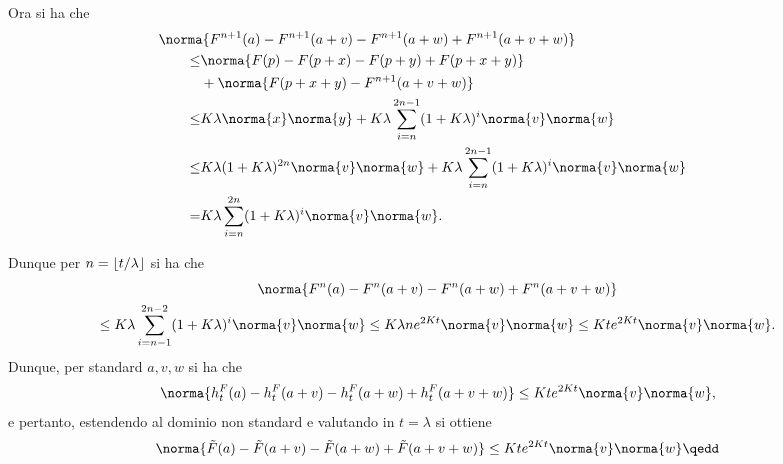 {\begin{itemize}
            Ora si ha che \begin{align*}
                &\hspace{-3em}\norma{F^{n+1}(a)-F^{n+1}(a+v)-F^{n+1}(a+w)+F^{n+1}(a+v+w)}\\ 
                \le  &\norma{F(p)-F(p+x)-F(p+y)+F(p+x+y)}\\&+\norma{F(p+x+y)-F^{n+1}(a+v+w)}\\ 
                \le &K \lambda\norma{x}\norma{y} + K \lambda\sum_{i=n}^{2n-1}(1+K\lambda)^{i}\norma{v}\norma{w} \\ 
                \le &K \lambda(1+K\lambda)^{2n}\norma{v}\norma{w} + K \lambda\sum_{i=n}^{2n-1}(1+K\lambda)^{i}\norma{v}\norma{w} \\ 
                = & K \lambda\sum_{i=n}^{2n}(1+K\lambda)^{i}\norma{v}\norma{w}. 
            \end{align*}
    \end{itemize}

    Dunque per $ n=\left\lfloor t/\lambda \right\rfloor $ si ha che \begin{multline*}
        \norma{F^{n}(a)-F^{n}(a+v)-F^{n}(a+w)+F^{n}(a+v+w)} \\
        \le K \lambda\sum_{i=n-1}^{2n-2}(1+K\lambda)^{i}\norma{v}\norma{w} \le K \lambda n e^{2Kt}\norma{v}\norma{w} \le K t e^{2Kt}\norma{v}\norma{w}.
    \end{multline*}Dunque, per standard $ a,v,w $ si ha che \begin{equation*}
        \norma{h_{t}^F(a)-h_{t}^F(a+v)-h_{t}^F(a+w)+h_{t}^F(a+v+w)}\le K t e^{2Kt}\norma{v}\norma{w},
    \end{equation*}e pertanto, estendendo al dominio non standard e valutando in $ t= \lambda $ si ottiene \begin{equation*}
        \norma{\tilde{F}(a)-\tilde{F}(a+v)-\tilde{F}(a+w)+\tilde{F}(a+v+w)}\le K t e^{2Kt}\norma{v}\norma{w}\qedd
    \end{equation*}
}
